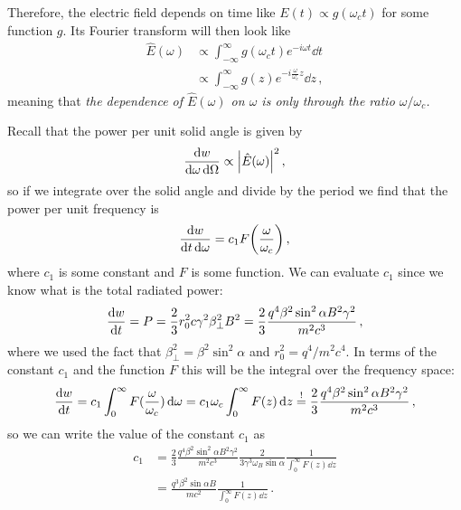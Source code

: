 \documentclass[main.tex]{subfiles}
\begin{document}
Therefore, the electric field depends on time like \(E(t) \propto g(\omega _c t)\) for some function \(g\). 
Its Fourier transform will then look like 
%
\begin{align}
\hat{E}(\omega ) &\propto \int_{- \infty }^{\infty } g(\omega _c t) e^{-i \omega t} \dd{t}  \\
&\propto \int_{-\infty }^{\infty } g(z) e^{-i \frac{\omega}{\omega _c} z} \dd{z}
\,,
\end{align}
%
meaning that \emph{the dependence of \(\hat{E}(\omega )\) on \(\omega \) is only through the ratio \(\omega / \omega _c\).}

Recall that the power per unit solid angle is given by 
%
\begin{align}
\frac{ \dd{w}}{ \dd{\omega } \dd{\Omega }} \propto \abs{\hat{E}(\omega )}^2
\,,
\end{align}
%
so if we integrate over the solid angle and divide by the period we find that the power per unit frequency is 
%
\begin{align}
\frac{ \dd{w}}{ \dd{t} \dd{\omega }} = c_1 F \qty(\frac{\omega }{\omega _c} )
\,,
\end{align}
%
where \(c_1 \) is some constant and \(F\) is some function. 
We can evaluate \(c_1 \) since we know what is the total radiated power: 
%
\begin{align}
\dv{w}{t} = P 
= \frac{2}{3} r_0^2 c \gamma^2 \beta_{\perp}^2B^2 
= \frac{2}{3} \frac{q^{4} \beta^2 \sin^2 \alpha B^2 \gamma^2}{m^2 c^3}
\,,
\end{align}
%
where we used the fact that \(\beta _\perp^2 = \beta^2 \sin^2 \alpha \) and \(r_0^2= q^{4} / m^2 c^{4}\). 
In terms of the constant \(c_1 \) and the function \(F\) this will be the integral over the frequency space: 
%
\begin{align}
\dv{w}{t} = c_1 \int_0^{\infty} F(\frac{\omega }{\omega _c}) \dd{\omega }  = 
c_1 \omega _c \int_0^{\infty } F(z) \dd{z} \overset{!}{=} 
\frac{2}{3} \frac{q^{4} \beta^2 \sin^2 \alpha B^2 \gamma^2}{m^2 c^3}
\,,
\end{align}
%
so we can write the value of the constant \(c_1 \) as 
%
\begin{align}
c_1 &= \frac{2}{3} \frac{q^{4} \beta^2 \sin^2 \alpha B^2 \gamma^2}{m^2 c^3} \frac{2}{3 \gamma^3 \omega _B \sin \alpha } \frac{1}{
\int_0^{\infty } F(z) \dd{z} 
}   \\
&= \frac{q^3 \beta^2  \sin \alpha B}{mc^2} \frac{1}{\int_0^{ \infty } F(z) \dd{z}}
\,.
\end{align}
\end{document}

